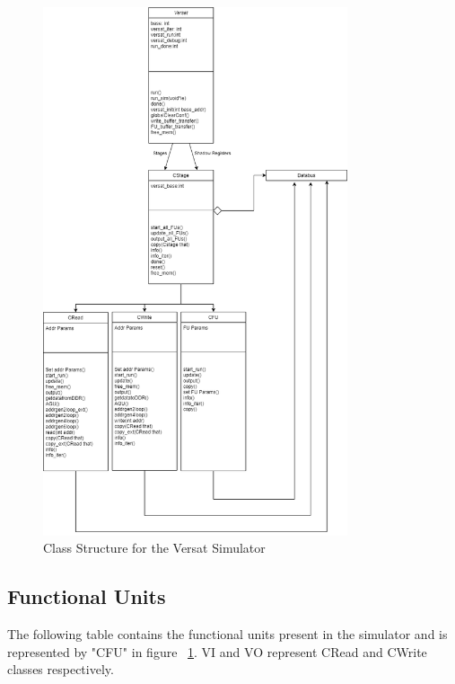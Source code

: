 \begin{figure}[!htbp]
    \centering
    \includegraphics[width=0.8\textwidth]{Figures/VersatSimulatorDraw.drawio.png}
    \caption{Class Structure for the Versat Simulator}
    \label{figure:VersatSimulatorClass}
\end{figure} 


\subsection{Functional Units}

The following table contains the functional units present in the simulator 
and is represented by 
"CFU" in figure ~\ref{figure:VersatSimulatorClass}. 
VI and VO represent CRead and CWrite 
classes respectively.



